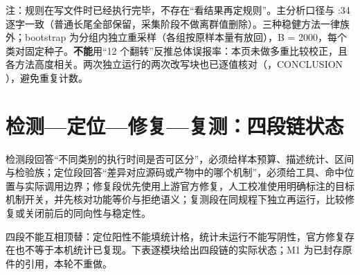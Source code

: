 \documentclass[UTF8,fontset=fandol,11pt,a4paper]{ctexart}
\begin{document}
\noindent 注：规则在写文件时已经执行完毕，不存在“看结果再定规则”。主分析口径与 \texttt{}:34 逐字一致（普通长尾全部保留，采集阶段不做离群值删除）。三种稳健方法一律族外；bootstrap 为分组内独立重采样（各组按原样本量有放回），B = 2000，每个类对固定种子。\textbf{不能}用“12 个翻转”反推总体误报率：本页未做多重比较校正，且各方法高度相关。两次独立运行的两次改写块也已逐值核对（\texttt{}，CONCLUSION \texttt{}），避免重复计数。\par\endgroup\vspace{3mm}
\section{检测—定位—修复—复测：四段链状态}
检测段回答“不同类别的执行时间是否可区分”，必须给样本预算、描述统计、区间与检验族；定位段回答“差异对应源码或产物中的哪个机制”，必须给工具、命中位置与实际调用边界；修复段优先使用上游官方修复，人工校准使用明确标注的目标机制开关，并先核对功能等价与拒绝语义；复测段在同规程下独立再运行，比较修复或关闭前后的同向性与稳定性。


四段不能互相顶替：定位阳性不能填统计格，统计未运行不能写阴性，官方修复存在也不等于本机统计已复现。下表逐模块给出四段链的实际状态；M1 为已封存原件的引用，本轮不重做。
\end{document}
